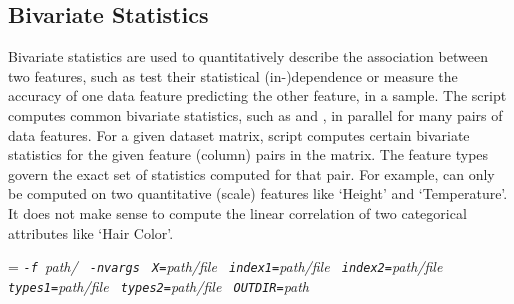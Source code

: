 \begin{comment}

 Licensed to the Apache Software Foundation (ASF) under one
 or more contributor license agreements.  See the NOTICE file
 distributed with this work for additional information
 regarding copyright ownership.  The ASF licenses this file
 to you under the Apache License, Version 2.0 (the
 "License"); you may not use this file except in compliance
 with the License.  You may obtain a copy of the License at

   http://www.apache.org/licenses/LICENSE-2.0

 Unless required by applicable law or agreed to in writing,
 software distributed under the License is distributed on an
 "AS IS" BASIS, WITHOUT WARRANTIES OR CONDITIONS OF ANY
 KIND, either express or implied.  See the License for the
 specific language governing permissions and limitations
 under the License.

\end{comment}

\subsection{Bivariate Statistics}

\smallskip

Bivariate statistics are used to quantitatively describe the association between
two features, such as test their statistical (in-)dependence or measure
the accuracy of one data feature predicting the other feature, in a sample.
The \BivarScriptName{} script computes common bivariate statistics,
such as \NameStatR{} and \NameStatChi{}, in parallel for many pairs
of data features.  For a given dataset matrix, script \BivarScriptName{} computes
certain bivariate statistics for the given feature (column) pairs in the
matrix.  The feature types govern the exact set of statistics computed for that pair.
For example, \NameStatR{} can only be computed on two quantitative (scale)
features like `Height' and `Temperature'. 
It does not make sense to compute the linear correlation of two categorical attributes
like `Hair Color'. 


\smallskip
{}
\smallskip

{\hangindent=\parindent\noindent\it%
{\tt{}-f }path/\/\BivarScriptName{}
{\tt{} -nvargs}
{\tt{} X=}path/file
{\tt{} index1=}path/file
{\tt{} index2=}path/file
{\tt{} types1=}path/file
{\tt{} types2=}path/file
{\tt{} OUTDIR=}path

}


